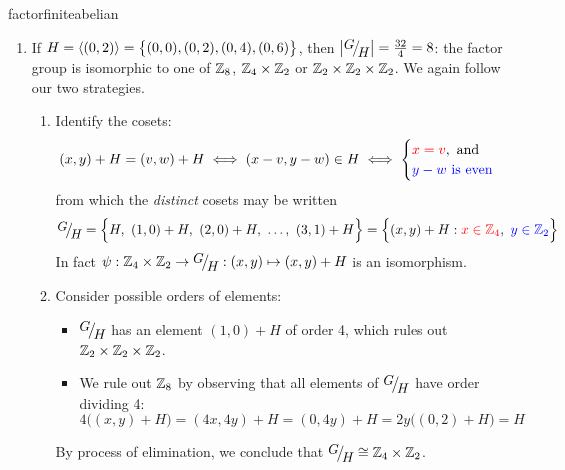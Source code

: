 \begin{examples}{}{factorfiniteabelian}
\begin{enumerate}
			 
	  \item If $H=\left\langle (0,2)\right\rangle=\bigl\{(0,0),(0,2),(0,4),(0,6)\bigr\}$, then $\nm{\quotient GH}=\frac{32}4=8$: the factor group is isomorphic to one of $\mathbb{Z}_8$, $\mathbb{Z}_4\times\mathbb{Z}_2$ or $\mathbb{Z}_2\times\mathbb{Z}_2\times\mathbb{Z}_2$. We again follow our two strategies.
		\begin{enumerate}
		  \item Identify the cosets:
			\[
				(x,y)+H=(v,w)+H\iff (x-v,y-w)\in H\iff 
				\begin{cases}
					\textcolor{red}{x=v},\text{ and}\\
					\textcolor{blue}{y-w\text{ is even}}
				\end{cases}
			\]
			from which the \emph{distinct} cosets may be written
			\[
				\quotient GH=\Bigl\{H,\ (1,0)+H,\ (2,0)+H,\ \ldots,\ (3,1)+H\Bigr\} =\Bigl\{(x,y)+H: \textcolor{red}{x\in\Z_4},\ \textcolor{blue}{y\in\Z_2}\Bigr\}
			\]
			In fact $\psi:\Z_4\times\Z_2\to\quotient GH:(x,y)\mapsto (x,y)+H$ is an isomorphism.
			\item Consider possible orders of elements:
			\begin{itemize}
	  		\item $\quotient GH$ has an element $(1,0)+H$ of order 4, which rules out $\mathbb{Z}_2\times\mathbb{Z}_2\times\mathbb{Z}_2$.
	  		\item We rule out $\mathbb{Z}_8$ by observing that all elements of $\quotient GH$ have order dividing 4:
	  		\[
	  			4\bigl((x,y)+H\bigr)
	  			=(4x,4y)+H
	  			=(0,4y)+H
	  			=2y\bigl((0,2)+H\bigr)
	  			=H
	  		\]
			\end{itemize}
			By process of elimination, we conclude that $\quotient GH\cong\Z_4\times\Z_2$.
	  \end{enumerate}

		\goodbreak
	

\end{enumerate}
\end{examples}

